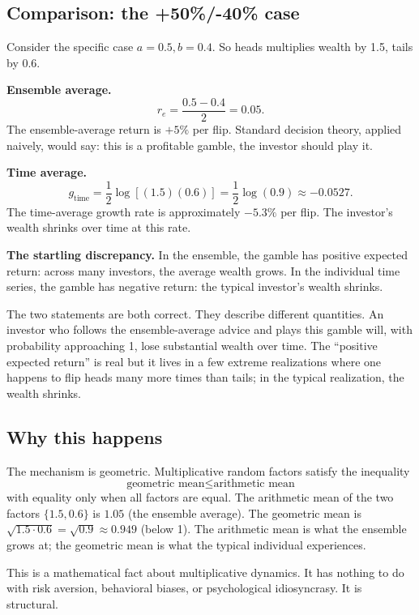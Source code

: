 \subsection{Comparison: the +50\%/-40\% case}

Consider the specific case $a = 0.5, b = 0.4$. So heads multiplies
wealth by 1.5, tails by 0.6.

\textbf{Ensemble average.}
\[
    r_e = \frac{0.5 - 0.4}{2} = 0.05.
\]
The ensemble-average return is $+5\%$ per flip. Standard decision
theory, applied naively, would say: this is a profitable gamble, the
investor should play it.

\textbf{Time average.}
\[
    g_{\text{time}} = \frac{1}{2} \log[(1.5)(0.6)] = \frac{1}{2} \log(0.9) \approx -0.0527.
\]
The time-average growth rate is approximately $-5.3\%$ per flip.
The investor's wealth shrinks over time at this rate.

\textbf{The startling discrepancy.} In the ensemble, the gamble has
positive expected return: across many investors, the average wealth
grows. In the individual time series, the gamble has negative
return: the typical investor's wealth shrinks.

The two statements are both correct. They describe different
quantities. An investor who follows the ensemble-average advice and
plays this gamble will, with probability approaching 1, lose
substantial wealth over time. The ``positive expected return'' is
real but it lives in a few extreme realizations where one happens
to flip heads many more times than tails; in the typical
realization, the wealth shrinks.

\subsection{Why this happens}

The mechanism is geometric. Multiplicative random factors satisfy
the inequality
\[
    \text{geometric mean} \leq \text{arithmetic mean}
\]
with equality only when all factors are equal. The arithmetic mean
of the two factors $\{1.5, 0.6\}$ is $1.05$ (the ensemble average).
The geometric mean is $\sqrt{1.5 \cdot 0.6} = \sqrt{0.9} \approx 0.949$
(below 1). The arithmetic mean is what the ensemble grows at; the
geometric mean is what the typical individual experiences.

This is a mathematical fact about multiplicative dynamics. It has
nothing to do with risk aversion, behavioral biases, or
psychological idiosyncrasy. It is structural.

